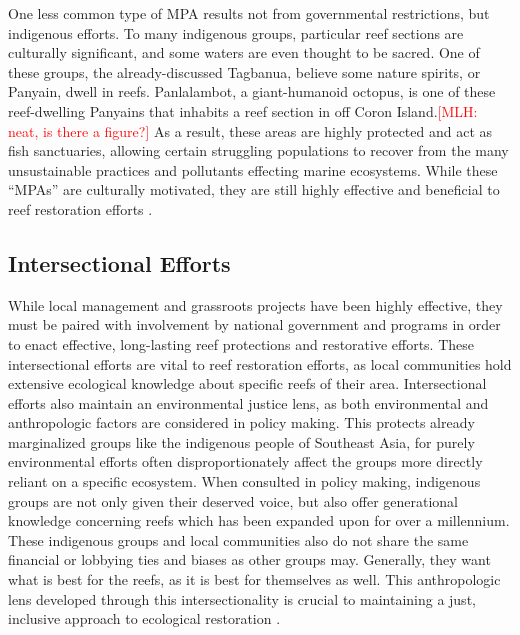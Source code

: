 \documentclass{book}\usepackage{knitr}
\newcommand{\red}[1]{\textcolor{red}{[MLH: #1]}}
\begin{document}
{One less common type of MPA results not from governmental restrictions, but indigenous efforts. To many indigenous groups, particular reef sections are culturally significant, and some waters are even thought to be sacred. One of these groups, the already-discussed Tagbanua, believe some nature spirits, or Panyain, dwell in reefs. Panlalambot, a giant-humanoid octopus, is one of these reef-dwelling Panyains that inhabits a reef section in off Coron Island.\red{neat, is there a figure?} As a result, these areas are highly protected and act as fish sanctuaries, allowing certain struggling populations to recover from the many unsustainable practices and pollutants effecting marine ecosystems. While these ``MPAs'' are culturally motivated, they are still highly effective and beneficial to reef restoration efforts \citep{4826000120100501}.

\subsection{Intersectional Efforts} \label{sub:ie}

While local management and grassroots projects have been highly effective, they must be paired with involvement by national government and programs in order to enact effective, long-lasting reef protections and restorative efforts. These intersectional efforts are vital to reef restoration efforts, as local communities hold extensive ecological knowledge about specific reefs of their area. Intersectional efforts also maintain an environmental justice lens, as both environmental and anthropologic factors are considered in policy making. This protects already marginalized groups like the indigenous people of Southeast Asia, for purely environmental efforts often disproportionately affect the groups more directly reliant on a specific ecosystem. When consulted in policy making, indigenous groups are not only given their deserved voice, but also offer generational knowledge concerning reefs which has been expanded upon for over a millennium. These indigenous groups and local communities also do not share the same financial or lobbying ties and biases as other groups may. Generally, they want what is best for the reefs, as it is best for themselves as well. This anthropologic lens developed through this intersectionality is crucial to maintaining a just, inclusive approach to ecological restoration \citep{13772149520190801}.

}
\end{document}
